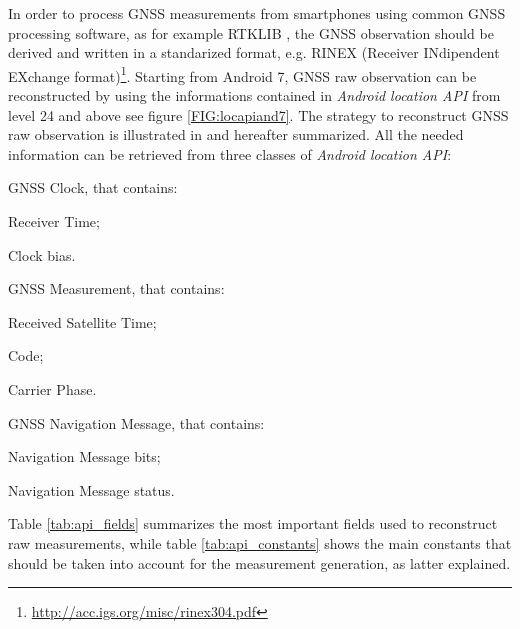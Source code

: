 In order to process GNSS measurements from smartphones using common GNSS processing software, as for example RTKLIB \cite{takasu:2009}, the GNSS observation should be derived and written in a standarized format, e.g. RINEX (Receiver INdipendent EXchange format)\footnote{\url{http://acc.igs.org/misc/rinex304.pdf}}. 
Starting from Android 7, GNSS raw observation can be reconstructed by using the informations contained in \textit{Android location API} from level 24 and above see figure \ref{FIG:locapiand7}. The strategy to reconstruct GNSS raw observation is illustrated in \cite{GSA_wp:2016} and hereafter summarized. All the needed information can be retrieved from three classes of \textit{Android location API}:
\clearpage
\begin{itemize}
	{\item GNSS Clock, that contains:}
	\begin{itemize}
		{\item Receiver Time;}
		{\item Clock bias.}
	\end{itemize}
	{\item GNSS Measurement, that contains:}
	\begin{itemize}
		{\item Received Satellite Time;}
		{\item Code;}
		{\item Carrier Phase.}
	\end{itemize}	
	{\item GNSS Navigation Message, that contains:}
	\begin{itemize}
		{\item Navigation Message bits;}
		{\item Navigation Message status.}
	\end{itemize}	
	
\end{itemize}

Table \ref{tab:api_fields} summarizes the most important fields used to reconstruct raw measurements, while table \ref{tab:api_constants} shows the main constants that should be taken into account for the measurement generation, as latter explained.

